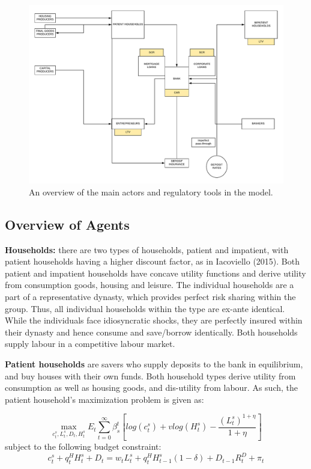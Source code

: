 \documentclass[12pt]{article}
\numberwithin{equation}{section}
\begin{document}
\begin{figure}[H]
\caption{An overview of the main actors and regulatory tools in the model.}
\label{model_overview}
\includegraphics[scale=0.5]{3d_flowchart_prud.pdf}
\end{figure}

\subsection{Overview of Agents}

\noindent
\textbf{Households:} there are two types of households, patient and impatient, with patient households having a higher discount factor, as in Iacoviello (2015). Both patient and impatient households have concave utility functions and derive utility from consumption goods, housing and leisure. The individual households are a part of a representative dynasty, which provides perfect risk sharing within the group. Thus, all individual households within the type are ex-ante identical. While the individuals face idiosyncratic shocks, they are perfectly insured within their dynasty and hence consume and save/borrow identically. Both households supply labour in a competitive labour market.

\noindent
\textbf{Patient households} are savers who supply deposits to the bank in equilibrium, and buy houses with their own funds. Both household types derive utility from consumption as well as housing goods, and dis-utility from labour. As such, the patient household's maximization problem is given as:

\begin{equation}
\max_{c^s_t,L^s_t,D_{t},H^s_t}E_t\sum _{t=0}^{\infty } \beta_{s}^t [log(c^s_t)+vlog(H^s_t)-\frac{(L^s_t)^{1+\eta}}{1+\eta} ]
\end{equation}
subject to the following budget constraint: 
\begin{equation}
c^s_t+q^H_{t}H^s_{t} +{D_{t}}=w_{t}L^s_{t}+q^H_{t}H^s_{t-1}(1-\delta)+{D_{t-1}}R^D_{t}+\pi_{t}
\end{equation}
\end{document}
